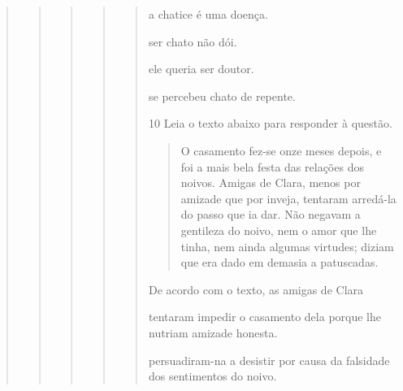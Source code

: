 \begin{quote}
\begin{quote}
\begin{quote}
\begin{quote}
\begin{quote}
\begin{escolha}

  \item a chatice é uma doença.
  
  \item ser chato não dói.
  
  \item ele queria ser doutor.
  
  \item se percebeu chato de repente.

\end{escolha}


\num{10} Leia o texto abaixo para responder à questão. 

\begin{quote}

O casamento fez-se onze meses depois, e foi a mais bela festa das
relações dos noivos. Amigas de Clara, menos por amizade que por
inveja, tentaram arredá-la do passo que ia dar. Não negavam a gentileza
do noivo, nem o amor que lhe tinha, nem ainda algumas virtudes; diziam
que era dado em demasia a patuscadas.

\end{quote}


De acordo com o texto, as amigas de Clara

\begin{escolha}

    \item tentaram impedir o casamento dela porque lhe nutriam amizade honesta.

    \item persuadiram-na a desistir por causa da falsidade dos sentimentos do noivo.  


\end{escolha}
\end{quote}
\end{quote}
\end{quote}
\end{quote}
\end{quote}
